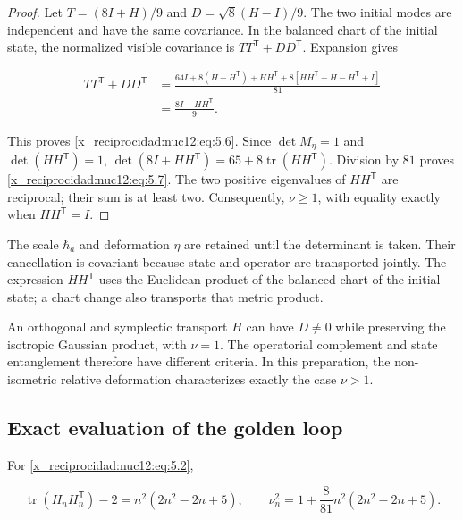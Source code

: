 \begin{proof}
Let \(T=(8I+H)/9\) and \(D=\sqrt8(H-I)/9\). The two initial modes are independent and have the same covariance. In the balanced chart of the initial state, the normalized visible covariance is \(TT^{\mathsf T}+DD^{\mathsf T}\). Expansion gives



\[
\begin{aligned}
TT^{\mathsf T}+DD^{\mathsf T}
&=\frac{64I+8(H+H^{\mathsf T})+HH^{\mathsf T}
+8[HH^{\mathsf T}-H-H^{\mathsf T}+I]}{81}\\
&=\frac{8I+HH^{\mathsf T}}9.
\end{aligned}
\]



This proves \eqref{x_reciprocidad:nuc12:eq:5.6}. Since \(\det M_\eta=1\) and \(\det(HH^{\mathsf T})=1\), \(\det(8I+HH^{\mathsf T})=65+8\operatorname{tr}(HH^{\mathsf T})\). Division by \(81\) proves \eqref{x_reciprocidad:nuc12:eq:5.7}. The two positive eigenvalues of \(HH^{\mathsf T}\) are reciprocal; their sum is at least two. Consequently, \(\nu\geq1\), with equality exactly when \(HH^{\mathsf T}=I\).
\end{proof}

The scale \(\hbar_a\) and deformation \(\eta\) are retained until the determinant is taken. Their cancellation is covariant because state and operator are transported jointly. The expression \(HH^{\mathsf T}\) uses the Euclidean product of the balanced chart of the initial state; a chart change also transports that metric product.

An orthogonal and symplectic transport \(H\) can have \(D\neq0\) while preserving the isotropic Gaussian product, with \(\nu=1\). The operatorial complement and state entanglement therefore have different criteria. In this preparation, the non-isometric relative deformation characterizes exactly the case \(\nu>1\).

\subsection{Exact evaluation of the golden loop}

For \eqref{x_reciprocidad:nuc12:eq:5.2},



\begin{equation}
\operatorname{tr}(H_nH_n^{\mathsf T})-2
=n^2(2n^2-2n+5),\qquad
\nu_n^2=1+\frac8{81}n^2(2n^2-2n+5).
\label{x_reciprocidad:nuc12:eq:5.8}
\end{equation}



